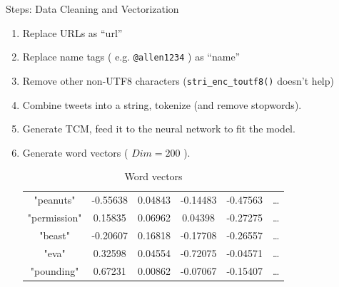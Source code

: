 \documentclass{beamer}
\begin{document}
\begin{frame}{Steps: Data Cleaning and Vectorization}
	\begin{enumerate}
		\item Replace URLs as ``url''
		\item Replace name tags ( e.g. \texttt{@allen1234} ) as ``name''
		\item Remove other non-UTF8 characters (\texttt{stri\_enc\_toutf8()} doesn't help)
		\item Combine tweets into a string, tokenize (and remove stopwords).
		\item Generate TCM, feed it to the neural network to fit the model.
		\item Generate word vectors ( $Dim = 200 $ ).
	\begin{table}[htpb]
		\scriptsize
		\centering
		\caption{Word vectors}
		\label{tab:wordVec}
		\begin{tabular}{c | c c c c c}
			"peanuts" & -0.55638 & 0.04843 & -0.14483 & -0.47563 & \ldots \\
			"permission" & 0.15835 & 0.06962 & 0.04398 & -0.27275 & \ldots \\ 
			"beast" & -0.20607 & 0.16818 & -0.17708 & -0.26557 & \ldots \\
			"eva" & 0.32598 & 0.04554 & -0.72075 & -0.04571 & \ldots \\
			"pounding" & 0.67231 & 0.00862 & -0.07067 & -0.15407 & \ldots \\
		\end{tabular}
	\end{table}
	\end{enumerate}
\end{frame}
\end{document}
